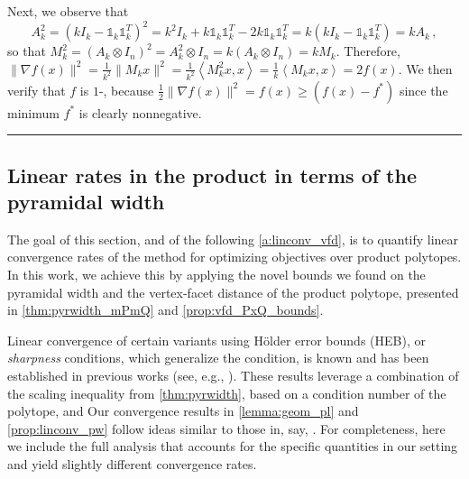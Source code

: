 \documentclass[twoside]{article}
\newcommand{\ones}{\mathbb{1}}
\newcommand{\jmlrBlackBox}{\rule{1.5ex}{1.5ex}}
\newcommand{\jmlrQED}{\hfill\jmlrBlackBox\par\bigskip}
\providecommand{\proofname}{Proof}
\renewenvironment{proof}{\par\noindent{\bfseries\upshape \proofname\ }}{\jmlrQED}
\newcommand{\innp}[1]{\left\langle #1 \right\rangle}
\begin{document}
\begin{proof}
Next, we observe that
\[
A_k^2 = (kI_k - \ones_k \ones_k^T)^2 = k^2I_k + k\ones_k\ones_k^T - 2k\ones_k\ones_k^T = k (kI_k - \ones_k\ones_k^T) = kA_k\,,
\]
so that $M_k^2 = (A_k \otimes I_n)^2 = A_k^2 \otimes I_n = k(A_k \otimes I_n) = kM_k$.
Therefore, $\|\nabla f(x)\|^2 = \frac{1}{k^2} \|M_k x\|^2 = \frac{1}{k^2}\innp{M_k^2x, x} = \frac{1}{k}\innp{M_k x, x} = 2f(x)$. 
%
We then verify that $f$ is $1$-\PL{}, because $\frac{1}{2}\|\nabla f(x)\|^2 = f(x) \geq \left( f(x) - f^\ast \right)$ since the minimum $f^\ast$ is clearly nonnegative.
\label{proof:qg_pl_intersection_k}
\end{proof}





\subsection{Linear rates in the product in terms of the pyramidal width}\label{a:linconv_pw}

The goal of this section, and of the following \cref{a:linconv_vfd}, is to quantify linear convergence rates of the \AFW{} method for optimizing \PL{} objectives over product polytopes. In this work, we achieve this by applying the novel bounds we found on the pyramidal width and the vertex-facet distance of the product polytope, presented in \cref{thm:pyrwidth_mPmQ} and \cref{prop:vfd_PxQ_bounds}.

Linear convergence of certain \FW{} variants using Hölder error bounds (HEB), or \emph{sharpness} conditions, which generalize the \PL{} condition, is known and has been established in previous works (see, e.g., \citep{BCC+23,KAP21}). %
These results leverage a combination of the scaling inequality from \cref{thm:pyrwidth}, based on a  condition number of the polytope, and
Our convergence results in \cref{lemma:geom_pl} and \cref{prop:linconv_pw} follow ideas similar to those in, say, {\citep[Theorem 2.29, Lemma 3.32, Corollary 3.33]{BCC+23}}. For completeness, here we include the full analysis that accounts for the specific quantities in our setting and yield slightly different convergence rates.
\end{document}

